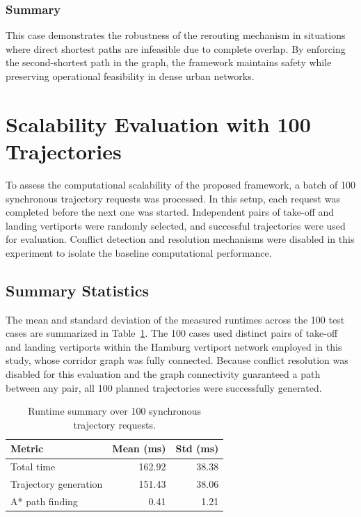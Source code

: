 \subsubsection*{Summary}
This case demonstrates the robustness of the rerouting mechanism in situations
where direct shortest paths are infeasible due to complete overlap.
By enforcing the second-shortest path in the graph, the framework maintains
safety while preserving operational feasibility in dense urban networks.

\section{Scalability Evaluation with 100 Trajectories}
\label{sec:scalability_eval}

To assess the computational scalability of the proposed framework, a batch of
100 synchronous trajectory requests was processed. In this setup, each request
was completed before the next one was started. Independent pairs of take-off
and landing vertiports were randomly selected, and successful trajectories were
used for evaluation. Conflict detection and resolution mechanisms were disabled
in this experiment to isolate the baseline computational performance.

\subsection*{Summary Statistics}
The mean and standard deviation of the measured runtimes across the 100 test cases are summarized in Table~\ref{tab:runtime_100}. 
The 100 cases used distinct pairs of take-off and landing vertiports within the Hamburg vertiport network employed in this study, whose corridor graph was fully connected. Because conflict resolution was disabled for this evaluation and the graph connectivity guaranteed a path between any pair, all 100 planned trajectories were successfully generated.

\begin{table}[H]
  \centering
  \caption{Runtime summary over 100 synchronous trajectory requests.}
  \label{tab:runtime_100}
  \begin{tabular}{l r r}
    \toprule
    Metric & Mean (ms) & Std (ms) \\
    \midrule
    Total time              & 162.92 & 38.38 \\
    Trajectory generation   & 151.43 & 38.06 \\
    A* path finding         & 0.41   & 1.21  \\
    \bottomrule
  \end{tabular}
\end{table}


